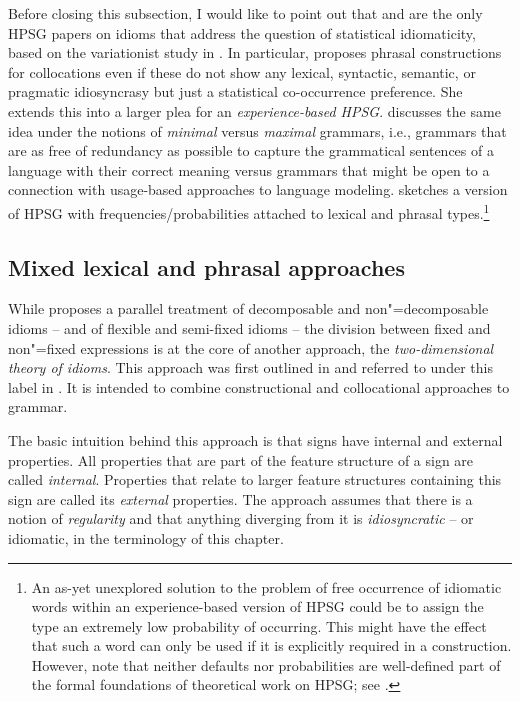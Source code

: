 \documentclass[output=paper,biblatex,babelshorthands,newtxmath,draftmode,colorlinks,citecolor=brown]{langscibook}
\begin{document}
Before closing this subsection, I would like to point out that \citet{Riehemann2001a} and
\citet{RB99a} are the only HPSG papers on idioms that address the question of statistical
idiomaticity, based on the variationist study in \citet{Bender2000a}.
In particular, \citet[--301]{Riehemann2001a} proposes phrasal constructions for
collocations even if these do not show any lexical, syntactic, semantic, or pragmatic idiosyncrasy
but just a statistical co-occurrence preference.  She extends this into a larger plea for an
\emph{experience-based HPSG}.
%
\citet{Bender2000a} discusses the same idea under the notions of \emph{minimal} versus
\emph{maximal} grammars, i.e., grammars that are as free of redundancy as possible to capture the
grammatical sentences of a language with their correct meaning versus grammars that might be open to
a connection with usage-based approaches to language modeling.  \citet[]{Bender2000a} sketches a version of HPSG with frequencies/probabilities attached to lexical and
phrasal types.\footnote{An as-yet unexplored solution to the problem of free occurrence of idiomatic
  words within an experience-based version of HPSG could be to assign the type 
  an extremely low probability of occurring. This might have the effect that such a word can only be
  used if it is explicitly required in a construction. However, note that neither
  defaults nor probabilities are well-defined part of the formal foundations of
  theoretical work on HPSG; see .}

\subsection{Mixed lexical and phrasal approaches}
\label{Sec-Mixed}

While \citet{Riehemann2001a} proposes a parallel treatment of decomposable and non"=decomposable
idioms -- and of flexible and semi-fixed idioms -- the division between fixed and non"=fixed
expressions is at the core of another approach, the \emph{two-dimensional theory of
  idioms}. This approach was first outlined in
\citet{Sailer2000a} and referred to under this label in
\citet{Richter:Sailer:09,Richter:Sailer:14}. It is intended to combine constructional and
collocational approaches to grammar.

The basic intuition behind this approach is that signs have internal and external properties.  All
properties that are part of the feature structure of a sign are called \emph{internal}.  Properties
that relate to larger feature structures containing this sign are called its \emph{external}
properties.  The approach assumes that there is a notion of \emph{regularity} and that anything
diverging from it is \emph{idiosyncratic} -- or idiomatic, in the terminology of this chapter.
\end{document}

